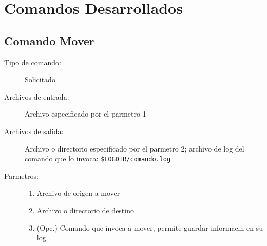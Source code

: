 \documentclass[12pt]{article}
\begin{document}
\section{Comandos Desarrollados}
\subsection{Comando Mover}
\begin{description}
	\item [Tipo de comando:] Solicitado
	
	\item [Archivos de entrada:] Archivo especificado por el parmetro 1
	
	\item [Archivos de salida:] Archivo o directorio especificado por el parmetro 2; archivo de log del comando que lo invoca: \verb|$LOGDIR/comando.log|
	
	\item [Parmetros:]
	\begin{enumerate}
		\item Archivo de origen a mover
		\item Archivo o directorio de destino
		\item (Opc.) Comando que invoca a mover, permite guardar informacin en su log
	\end{enumerate}
	

\end{description}
\end{document}
